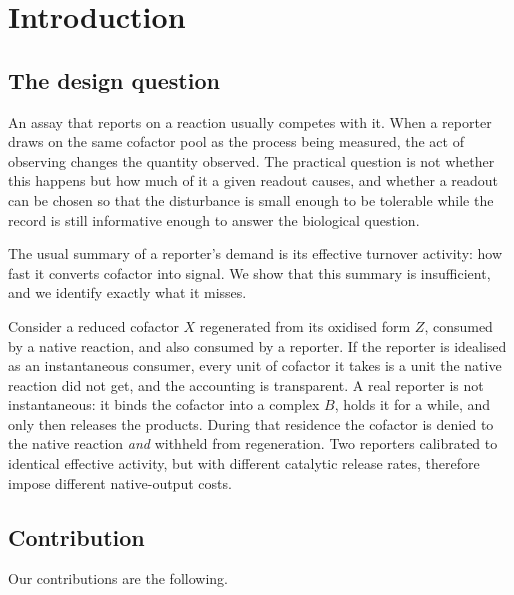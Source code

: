 \documentclass[11pt]{article}
\theoremstyle{definition}
\theoremstyle{remark}
\begin{document}
\tableofcontents

\section{Introduction}

\subsection{The design question}

An assay that reports on a reaction usually competes with it. When a reporter
draws on the same cofactor pool as the process being measured, the act of
observing changes the quantity observed. The practical question is not whether
this happens but how much of it a given readout causes, and whether a readout
can be chosen so that the disturbance is small enough to be tolerable while the
record is still informative enough to answer the biological question.

The usual summary of a reporter's demand is its effective turnover activity:
how fast it converts cofactor into signal. We show that this summary is
insufficient, and we identify exactly what it misses.

Consider a reduced cofactor $X$ regenerated from its oxidised form $Z$, consumed
by a native reaction, and also consumed by a reporter. If the reporter is
idealised as an instantaneous consumer, every unit of cofactor it takes is a
unit the native reaction did not get, and the accounting is transparent. A real
reporter is not instantaneous: it binds the cofactor into a complex $B$, holds
it for a while, and only then releases the products. During that residence the
cofactor is denied to the native reaction \emph{and} withheld from regeneration.
Two reporters calibrated to identical effective activity, but with different
catalytic release rates, therefore impose different native-output costs.

\subsection{Contribution}

Our contributions are the following.
\end{document}
